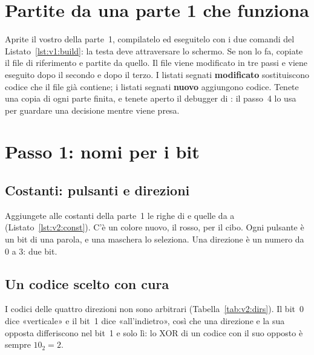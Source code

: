 \section{Partite da una parte 1 che funziona}

Aprite il vostro  della parte~1, compilatelo ed eseguitelo con i
due comandi del Listato~\ref{lst:v1:build}: la testa deve attraversare lo
schermo. Se non lo fa, copiate il file di riferimento  e
partite da quello. Il file viene modificato in tre passi e viene eseguito dopo
il secondo e dopo il terzo. I listati segnati \textbf{modificato} sostituiscono
codice che il file già contiene; i listati segnati \textbf{nuovo} aggiungono
codice. Tenete una copia di ogni parte finita, e tenete aperto il debugger di
\prgqt: il passo~4 lo usa per guardare una decisione mentre viene presa.

\section{Passo 1: nomi per i bit}

\subsection{Costanti: pulsanti e direzioni}

Aggiungete alle costanti della parte~1 le righe di  e quelle da
 a  (Listato~\ref{lst:v2:const}). C'è un colore
nuovo, il rosso, per il cibo. Ogni pulsante è un bit di una parola, e una
maschera lo seleziona. Una direzione è un numero da 0 a 3: due bit.


\subsection{Un codice scelto con cura}

I codici delle quattro direzioni non sono arbitrari
(Tabella~\ref{tab:v2:dirs}). Il bit~0 dice «verticale» e il bit~1 dice
«all'indietro», così che una direzione e la sua opposta differiscono nel bit~1
e solo lì: lo XOR di un codice con il suo opposto è sempre $10_2=2$.

